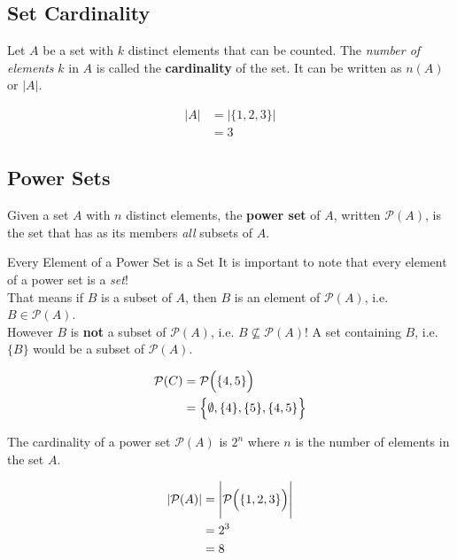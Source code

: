 \documentclass[../notes.tex]{subfiles}
\begin{document}
      \subsection{Set Cardinality}
        Let $A$ be a set with $k$ distinct elements that can be counted. The \textit{number of elements} $k$ in $A$ is called the \textbf{cardinality} of the set. It can be written as $n(A)$ or $\left\lvert A\right\rvert$.
        \begin{examplebox}
          \begin{align*}
            \left\lvert A\right\rvert &= \left\lvert \{1, 2, 3\}\right\rvert\\
            &= 3
          \end{align*}
        \end{examplebox}

      \subsection{Power Sets}
        Given a set $A$ with $n$ distinct elements, the \textbf{power set} of $A$, written $\mathcal{P}(A)$, is the set that has as its members \textit{all} subsets of $A$.

        \begin{notebox}{Every Element of a Power Set is a Set}
          It is important to note that every element of a power set is a \textit{set}!\\ That means if $B$ is a subset of $A$, then $B$ is an element of $\mathcal{P}(A)$, i.e. $B \in \mathcal{P}(A)$.\\
          However $B$ is \textbf{not} a subset of $\mathcal{P}(A)$, i.e. $B \nsubseteq \mathcal{P}(A)$! A set containing $B$, i.e. $\{B\}$ would be a subset of $\mathcal{P}(A)$.
        \end{notebox}
      \begin{examplebox}
        \begin{align*}
          \mathcal{P}(C) &= \mathcal{P}\Bigl(\{4, 5\}\Bigr)\\
          &= \Bigl\{\emptyset, \{4\}, \{5\}, \{4, 5\}\Bigr\}
        \end{align*}
      \end{examplebox}
      The cardinality of a power set $\mathcal{P}(A)$ is $2^{n}$ where $n$ is the number of elements in the set $A$.
      \begin{examplebox}
        \begin{align*}
          \left\lvert \mathcal{P}(A)\right\rvert &= \Biggl|\mathcal{P}\Bigl(\{1, 2, 3\}\Bigr)\Biggr|\\
          &= 2^{3}\\
          &= 8
        \end{align*}
      \end{examplebox}
\end{document}
